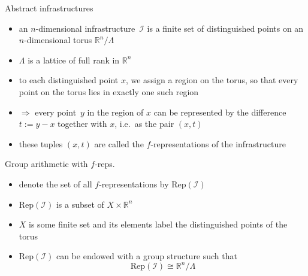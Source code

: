 \documentclass[slideColor]{prosper}
\renewcommand{\R}{\mathbb{R}}
\renewcommand{\>}{\rangle}
\newcommand{\<}{\langle}
\begin{document}

\begin{slide}{Abstract infrastructures}

\begin{itemize}
	\item an $n$-dimensional infrastructure~$\mathcal{I}$ is a finite set of distinguished
  points on an $n$-dimensional torus $\mathbb{R}^n / \Lambda$
  
  \medskip
  \item $\Lambda$ is a lattice of full rank in $\R^n$ 
  
  \medskip
  \item to each distinguished point $x$, we assign a region on the torus, so
  that every point on the torus lies in exactly one such region
  
  \medskip
  \item $\Rightarrow$ every point~$y$ in the region of $x$ can be represented by the difference $t := y - x$ together
  with $x$, i.e.\ as the pair $(x, t)$ 
  
  \medskip
  \item these tuples $(x, t)$ are called the $f$-representations
  of the infrastructure
\end{itemize}

\end{slide}


\begin{slide}{Group arithmetic with $f$-reps.}

\begin{itemize}
\item denote the set of all $f$-representations by $\mathrm{Rep}(\mathcal{I})$

\bigskip
\item $\mathrm{Rep}(\mathcal{I})$ is a subset of $X \times \R^n$

\bigskip
\item $X$ is some finite set and its elements label the distinguished points of the torus

\bigskip
\item $\mathrm{Rep}(\mathcal{I})$ can be endowed with a group structure such that 
\[
\mathrm{Rep}(\mathcal{I}) \cong \R^n / \Lambda
\]
\end{itemize}

\end{slide}
\end{document}
